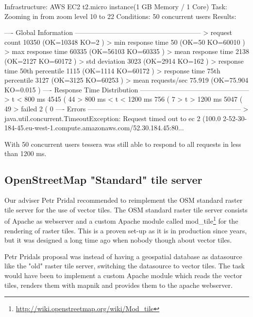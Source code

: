 Infrastructure: AWS EC2 t2.micro instance(1 GB Memory / 1 Core)
Task: Zooming in from zoom level 10 to 22
Conditions: 50 concurrent users
Results:
\begin{bashcode}
---- Global Information --------------------------------------------------------
> request count                                      10350 (OK=10348  KO=2     )
> min response time                                     50 (OK=50     KO=60010 )
> max response time                                  60335 (OK=56103  KO=60335 )
> mean response time                                  2138 (OK=2127   KO=60172 )
> std deviation                                       3023 (OK=2914   KO=162   )
> response time 50th percentile                       1115 (OK=1114   KO=60172 )
> response time 75th percentile                       3127 (OK=3125   KO=60253 )
> mean requests/sec                                 75.919 (OK=75.904 KO=0.015 )
---- Response Time Distribution ------------------------------------------------
> t < 800 ms                                          4545 ( 44%
> 800 ms < t < 1200 ms                                 756 (  7%
> t > 1200 ms                                         5047 ( 49%
> failed                                                 2 (  0%
---- Errors --------------------------------------------------------------------
> java.util.concurrent.TimeoutException: Request timed out to ec      2 (100.0%
2-52-30-184-45.eu-west-1.compute.amazonaws.com/52.30.184.45:80...
\end{bashcode}

With 50 concurrent users tessera was still able to respond to all requests in less than 1200 ms.

\subsection{OpenStreetMap "Standard" tile server}\label{osm_standard_tile_server}
Our adviser Petr Pridal recommended to reimplement the OSM standard raster tile server for the use of vector tiles. The OSM standard raster tile server consists of Apache as webserver and a custom Apache module called mod\_tile\footnote{\url{http://wiki.openstreetmap.org/wiki/Mod_tile}} for the rendering of raster tiles. This is a proven set-up as it is in production since years, but it was designed a long time ago when nobody though about vector tiles.

Petr Pridals proposal was instead of having a geospatial database as datasource like the "old" raster tile server, switching the datasource to vector tiles. The task would have been to implement a custom Apache module which reads the vector tiles, renders them with mapnik and provides them to the apache webserver.

